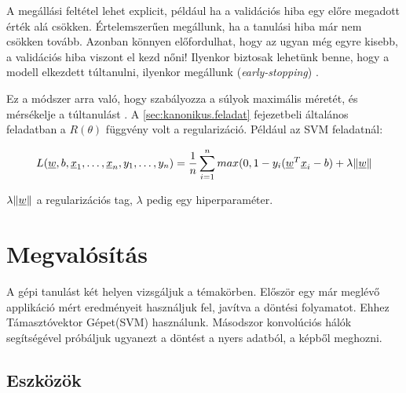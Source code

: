A megállási feltétel lehet explicit, például ha a validációs hiba egy előre
megadott érték alá csökken. Értelemszerűen megállunk, ha a tanulási hiba már nem csökken tovább.
Azonban könnyen előfordulhat, hogy az ugyan még egyre kisebb, a validációs hiba
viszont el kezd nőni! Ilyenkor biztosak lehetünk benne, hogy a modell elkezdett
túltanulni, ilyenkor megállunk (\textit{early-stopping}) \cite{earlystopping}.




Ez a módszer arra való, hogy szabályozza a súlyok maximális méretét, és mérsékelje a túltanulást \cite{regularizacio}. A \ref{sec:kanonikus.feladat} fejezetbeli általános feladatban a $ R(\theta) $ függvény volt a regularizáció. Például az SVM feladatnál:


\[  L(\underline{w},b, \underline{x}_1, \dots, \underline{x}_n, y_1, \dots, y_n)  = \frac{1}{n} \sum\limits_{i=1}^{n} 
max(0, 1 - y_i(\underline{w}^T \underline{x}_i - b) + \lambda \lVert\underline{w}\rVert  \]

\noindent
$  \lambda \lVert\underline{w}\rVert $ a regularizációs tag, $ \lambda $ pedig egy hiperparaméter.





\newpage
\section{Megvalósítás}

A gépi tanulást két helyen vizsgáljuk a témakörben.
Először egy már meglévő applikáció mért eredményeit használjuk fel,
javítva a döntési folyamatot. Ehhez Támasztóvektor Gépet(SVM) használunk.
Másodszor konvolúciós hálók segítségével próbáljuk ugyanezt a döntést 
a nyers adatból, a képből meghozni. 

\subsection{Eszközök}

